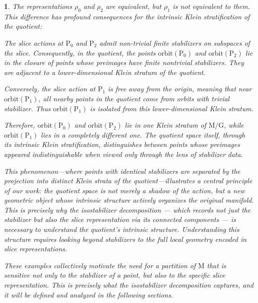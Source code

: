 \documentclass[10pt,reqno,letterpaper,twoside]{amsart}
\theoremstyle{article}
\newtheorem{article}{}
\def \G{\mathrm G}
\def \M{\mathrm M}
\def \P{\mathrm P}
\newcommand{\orbit}{{\mathrm{orbit}}}
\begin{document}
\begin{article}
    The representations $\rho_0$ and $\rho_2$ are equivalent,
    but $\rho_1$ is not equivalent to them.
    This difference has profound consequences for the intrinsic Klein stratification of the quotient:
    
    The slice actions at $\P_0$ and $\P_2$ admit non-trivial finite stabilizers on subspaces of the slice.
    Consequently,
    in the quotient,
    the points $\orbit(\P_0)$ and $\orbit(\P_2)$ lie in the closure of points whose preimages have finite nontrivial stabilizers.
    They are adjacent to a lower-dimensional Klein stratum of the quotient.
    
    Conversely,
    the slice action at $\P_1$ is free away from the origin, meaning that near $\orbit(\P_1)$,
    all nearby points in the quotient come from orbits with trivial stabilizer.
    Thus $\orbit(\P_1)$ is isolated from this lower-dimensional Klein stratum.
    
    Therefore,
    $\orbit(\P_0)$ and $\orbit(\P_2)$ lie in one Klein stratum of $\M/\G$,
    while $\orbit(\P_1)$ lies in a completely different one.
    The quotient space itself,
    through its intrinsic Klein stratification,
    distinguishes between points whose preimages appeared indistinguishable when viewed only through the lens of stabilizer data.
    
    This phenomenon—where points with identical stabilizers are separated by the projection into distinct Klein strata of the quotient—illustrates a central principle of our work:
    the quotient space is not merely a shadow of the action, but a new geometric object whose intrinsic structure actively organizes the original manifold.
    This is precisely why the isostabilizer decomposition — which records not just the stabilizer but also the slice representation via its connected components — is necessary to understand the quotient's intrinsic structure.
    Understanding this structure requires looking beyond stabilizers to the full local geometry encoded in slice representations.
    
    These examples collectively motivate the need for a partition of $\M$ that is sensitive not only to the stabilizer of a point,
    but also to the specific slice representation.
    This is precisely what the isostabilizer decomposition captures,
    and it will be defined and analyzed in the following sections.
    
  \end{article}
  
  
\end{document}
